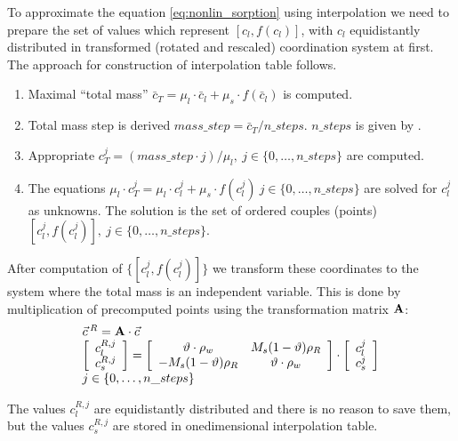 To approximate the equation \eqref{eq:nonlin_sorption} using interpolation we need to prepare the set of values 
which represent $[c_l, f(c_l)]$, with $c_l$ equidistantly distributed in transformed (rotated and rescaled) 
coordination system at first. The approach for construction of interpolation table follows.
\begin{enumerate}
 \item Maximal ``total mass'' $\bar{c}_T = \mu_l\cdot \bar{c}_l + \mu_s\cdot f(\bar{c}_l)$ is computed.
 \item Total mass step is derived $mass\_step = \bar{c}_T/n\_steps$. $n\_steps$ is given by
       .
 \item Appropriate $c_T^j = (mass\_step\cdot j)/\mu_l,~j\in \{0,\ldots, n\_steps\}$ are computed. 
 \item The equations $\mu_l \cdot c_T^j = \mu_l\cdot c_l^j + \mu_s\cdot f(c_l^j)~j\in \{0,\ldots, n\_steps\}$ are solved 
       for $c_l^j$ as unknowns. The solution is the set of ordered couples (points) 
       $[c_l^j,f(c_l^j)],~j\in\{0,\ldots,n\_steps\}$.
\end{enumerate}
After computation of $\{[c_l^j,f(c_l^j)]\}$ we transform these coordinates to the system where the total mass is 
an independent variable. This is done by multiplication of precomputed points using the transformation matrix ${\bf A}$:
\begin{equation}
 \begin{array}{l}
  \vec{c}\,^R = {\bf A}\cdot\vec{c}\\
  \left[\begin{array}{c} c_l^{R,j}\\ c_s^{R,j} \end{array}\right] = 
  \left[\begin{array}{cc}
    \vartheta\cdot \rho_w & M_s(1 - \vartheta)\rho_R\\
    -M_s(1 - \vartheta)\rho_R & \vartheta\cdot \rho_w
  \end{array}\right]\cdot
  \left[\begin{array}{c} c_l^j\\ c_s^j \end{array}\right]\\
  j\in\{0,\ldots,n\_steps\}
 \end{array}
 \label{eq:transf_mat}
\end{equation}

The values $c_l^{R,j}$ are equidistantly distributed and there is no reason to save them, but the values 
$c_s^{R,j}$ are stored in onedimensional interpolation table.

